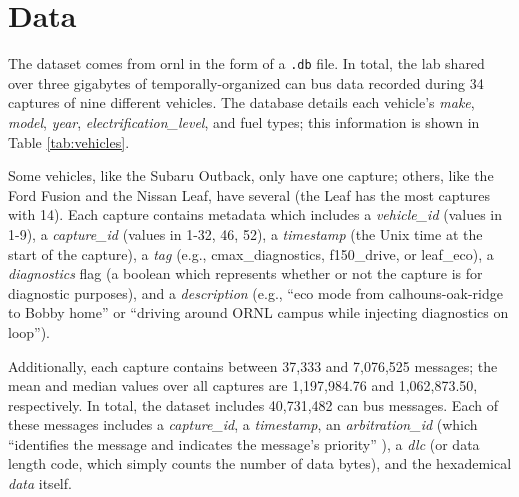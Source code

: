 \documentclass[11pt]{article}
\begin{document}
\section{Data}

The dataset comes from \ac{ornl} in the form of a \texttt{.db} file. In total, the lab shared over three gigabytes of temporally-organized \ac{can} bus data recorded during 34 captures of nine different vehicles. The database details each vehicle's \textit{make}, \textit{model}, \textit{year}, \textit{electrification\_level}, and fuel types; this information is shown in Table \ref{tab:vehicles}.

Some vehicles, like the Subaru Outback, only have one capture; others, like the Ford Fusion and the Nissan Leaf, have several (the Leaf has the most captures with 14). Each capture contains metadata which includes
a \textit{vehicle\_id} (values in 1-9),
a \textit{capture\_id} (values in 1-32, 46, 52),
a \textit{timestamp} (the Unix time at the start of the capture),
a \textit{tag} (e.g., cmax\_diagnostics, f150\_drive, or leaf\_eco),
a \textit{diagnostics} flag (a boolean which represents whether or not the capture is for diagnostic purposes),
and a \textit{description} (e.g., ``eco mode from calhouns-oak-ridge to Bobby home'' or ``driving around ORNL campus while injecting diagnostics on loop''). 

Additionally, each capture contains between 37,333 and 7,076,525 messages; the mean and median values over all captures are 1,197,984.76 and 1,062,873.50, respectively. In total, the dataset includes 40,731,482 \ac{can} bus messages. Each of these messages includes a \textit{capture\_id}, a \textit{timestamp}, an \textit{arbitration\_id} (which ``identifies the message and indicates the message's priority'' \cite{can:overview}), a \textit{dlc} (or data length code, which simply counts the number of data bytes), and the hexademical \textit{data} itself.
\end{document}
